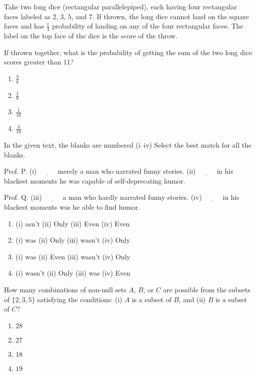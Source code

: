 \item Take two long dice (rectangular parallelepiped), each having four rectangular faces labeled as $2$, $3$, $5$, and $7$. If thrown, the long dice cannot land on the square faces and has $\frac{1}{4}$ probability of landing on any of the four rectangular faces. The label on the top face of the dice is the score of the throw.

If thrown together, what is the probability of getting the sum of the two long dice scores greater than $11$?
\begin{enumerate}
    \item $\frac{3}{8}$
    \item $\frac{1}{8}$
    \item $\frac{1}{16}$
    \item $\frac{3}{16}$
\end{enumerate}
\item In the given text, the blanks are numbered (i–iv) Select the best match for all the blanks.

Prof. P. (i) $\underline{\hspace{1cm}}$ merely a man who narrated funny stories. (ii) $\underline{\hspace{1cm}}$ in his blackest moments he was capable of self-deprecating humor.

Prof. Q. (iii) $\underline{\hspace{1cm}}$ a man who hardly narrated funny stories. (iv) $\underline{\hspace{1cm}}$ in his blackest moments was he able to find humor.
\begin{enumerate}
    \item (i) asn't \quad (ii) Only \quad (iii) Even \quad (iv) Even
    \item (i) was \quad (ii) Only \quad (iii) wasn't \quad (iv) Only
    \item (i) was \quad (ii) Even \quad (iii) wasn't \quad (iv) Only
    \item (i) wasn't \quad (ii) Only \quad (iii) was \quad (iv) Even
\end{enumerate}

\item How many combinations of non-null sets $A$, $B$, or $C$ are possible from the subsets of $\{ 2, 3, 5 \}$ satisfying the conditions: (i) $A$ is a subset of $B$, and (ii) $B$ is a subset of $C$?
\begin{enumerate}
    \item $28$
    \item $27$
    \item $18$
    \item $19$
\end{enumerate}

